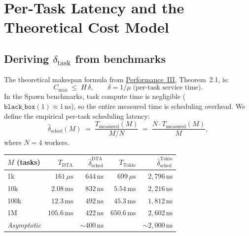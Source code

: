 \documentclass[11pt,a4paper]{article}
\begin{document}
\section{Per-Task Latency and the Theoretical Cost Model}

\subsection{Deriving $\delta_{\mathrm{task}}$ from benchmarks}

The theoretical makespan formula from \hyperref[chap:makespan]{Performance~III},
Theorem~2.1, is:
\[
  C_{\max} \;\le\; H\,\delta,
  \qquad \delta = 1/\mu \;\text{(per-task service time)}.
\]
In the Spawn benchmarks, task compute time is negligible
($\texttt{black\_box}(1) \approx 1\,\mathrm{ns}$), so the entire measured
time is scheduling overhead.  We define the empirical per-task scheduling
latency:
\begin{equation}\label{eq:delta_emp}
  \hat\delta_{\mathrm{sched}}(M)
  \;=\;
  \frac{T_{\mathrm{measured}}(M)}{M / N}
  \;=\;
  \frac{N \cdot T_{\mathrm{measured}}(M)}{M},
\end{equation}
where $N=4$ workers.

\begin{center}
\begin{tabular}{lrrrr}
\toprule
$M$ (tasks) & $T_{\mathrm{DTA}}$ & $\hat\delta_{\mathrm{sched}}^{\mathrm{DTA}}$ &
$T_{\mathrm{Tokio}}$ & $\hat\delta_{\mathrm{sched}}^{\mathrm{Tokio}}$ \\
\midrule
1k    & $161\,\mu\mathrm{s}$ & $644\,\mathrm{ns}$ & $699\,\mu\mathrm{s}$ & $2{,}796\,\mathrm{ns}$ \\
10k   & $2.08\,\mathrm{ms}$  & $832\,\mathrm{ns}$ & $5.54\,\mathrm{ms}$  & $2{,}216\,\mathrm{ns}$ \\
100k  & $12.3\,\mathrm{ms}$  & $492\,\mathrm{ns}$ & $45.3\,\mathrm{ms}$  & $1{,}812\,\mathrm{ns}$ \\
1M    & $105.6\,\mathrm{ms}$ & $422\,\mathrm{ns}$ & $650.6\,\mathrm{ms}$ & $2{,}602\,\mathrm{ns}$ \\
\midrule
\textit{Asymptotic} & & $\sim\!400\,\mathrm{ns}$ & & $\sim\!2{,}000\,\mathrm{ns}$ \\
\bottomrule
\end{tabular}
\end{center}
\end{document}
